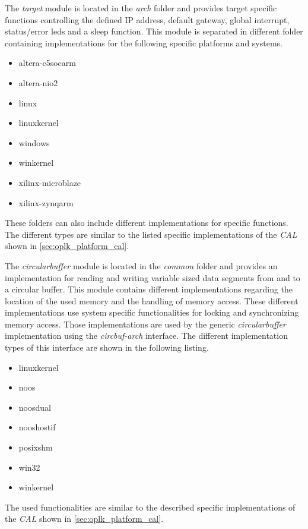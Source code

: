 \begin{description}[leftmargin=1cm]
    \item[target] The \emph{target} module is located in the \emph{arch} folder and provides target specific functions controlling the defined IP address, default gateway, global interrupt, status/error leds and a sleep function.
    This module is separated in different folder containing implementations for the following specific platforms and systems.
    \begin{multicols}{3}
        \begin{itemize}
            \item altera-c5socarm
            \item altera-nio2
            \item linux
            \item linuxkernel
            \item windows
            \item winkernel
            \item xilinx-microblaze
            \item xilinx-zynqarm
        \end{itemize}
    \end{multicols}
    These folders can also include different implementations for specific functions.
    The different types are similar to the listed specific implementations of the \emph{CAL} shown in \ref{sec:oplk_platform_cal}.\\
    
    \item[circularbuffer] The \emph{circularbuffer} module is located in the \emph{common} folder and provides an implementation for reading and writing variable sized data segments from and to a circular buffer.
    This module contains different implementations regarding the location of the used memory and the handling of memory access.
    These different implementations use system specific functionalities for locking and synchronizing memory access.
    Those implementations are used by the generic \emph{circularbuffer} implementation using the \emph{circbuf-arch} interface.
    The different implementation types of this interface are shown in the following listing.
    \begin{multicols}{3}
        \begin{itemize}
            \item linuxkernel
            \item noos
            \item noosdual
            \item nooshostif
            \item posixshm
            \item win32
            \item winkernel
        \end{itemize}
    \end{multicols}
    The used functionalities are similar to the described specific implementations of the \emph{CAL} shown in \ref{sec:oplk_platform_cal}.\\
    

\end{description}
